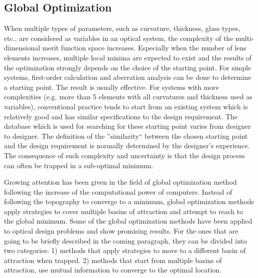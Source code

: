 \subsection{Global Optimization}
\vspace{1em}
When multiple types of parameters, such as curvature, thickness, glass types, etc., are considered as variables in an optical system, the complexity of the multi-dimensional merit function space increases. Especially when the number of lens elements increases, multiple local minima are expected to exist and the results of the optimization strongly depends on the choice of the starting point. For simple systems, first-order calculation and aberration analysis can be done to determine a starting point. The result is usually effective. For systems with more complexities (e.g. more than 5 elements with all curvatures and thickness used as variables), conventional practice tends to start from an existing system which is relatively good and has similar specifications to the design requirement. The database which is used for searching for these starting point varies from designer to designer. The definition of the ”similarity“ between the chosen starting point and the design requirement is normally determined by the designer's experience. The consequence of such complexity and uncertainty is that the design process can often be trapped in a sub-optimal minimum. 

Growing attention has been given in the field of global optimization method following the increase of the computational power of computers. Instead of following the topography to converge to a minimum, global optimization methods apply strategies to cover multiple basins of attraction and attempt to reach to the global minimum. Some of the global optimization methods have been applied to optical design problems and show promising results. For the ones that are going to be briefly described in the coming paragraph, they can be divided into two categories: 1) methods that apply strategies to move to a different basin of attraction when trapped. 2) methods that start from multiple basins of attraction, use mutual information to converge to the optimal location. 

